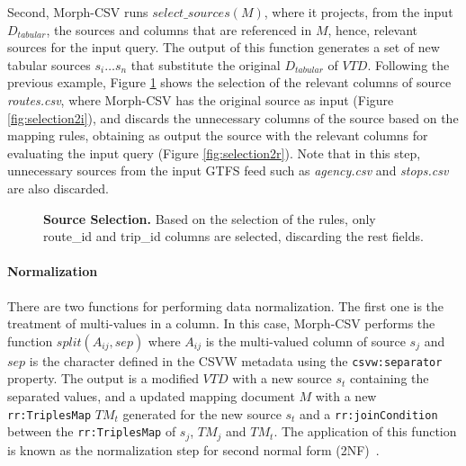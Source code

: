 Second, Morph-CSV runs $select\_sources(M)$, where it projects, from the input $D_{tabular}$, the sources and columns that are referenced in $M$, hence, relevant sources for the input query. The output of this function generates a set of new tabular sources $s_i\ldots s_n$ that substitute the original $D_{tabular}$ of $VTD$. Following the previous example, Figure \ref{fig:selection2} shows the selection of the relevant columns of  source \textit{routes.csv}, where Morph-CSV has the original source as  input  (Figure \ref{fig:selection2i}), and discards the unnecessary columns of the source based on the mapping rules, obtaining as output the source with the relevant columns for evaluating the input query (Figure \ref{fig:selection2r}). Note that in this step, unnecessary sources from the input GTFS feed such as \textit{agency.csv} and \textit{stops.csv} are also discarded.

\begin{figure}[ht]
\centering
{}
\caption[Source selection]{\textbf{Source Selection.} Based on the selection of the rules, only route\_id and trip\_id columns are selected, discarding the rest fields.}
\label{fig:selection2}
\end{figure}

\paragraph{Normalization}
There are two functions for performing data normalization. The first one is the treatment of multi-values in a column. In this case, Morph-CSV performs the function $split(A_{ij},sep)$ where $A_{ij}$ is the multi-valued column of source $s_{j}$ and $sep$ is the character defined in the CSVW metadata using the \texttt{csvw:separator} property. The output is a modified $VTD$ with a new source $s_t$ containing the separated values, and a updated mapping document $M$ with a new \texttt{rr:TriplesMap} $TM_t$ generated for the new source $s_t$ and a \texttt{rr:joinCondition} between the \texttt{rr:TriplesMap} of $s_j$, $TM_j$ and $TM_t$. 
The application of this function is known as the normalization step for second normal form (2NF)~\citep{codd1979extending}.
 
